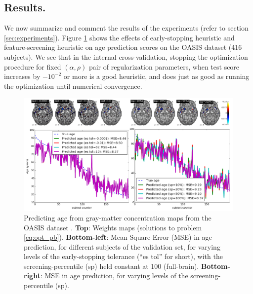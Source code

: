 \subsection{Results.}
We now summarize and comment the results of the experiments (refer to
section \ref{sec:experiments}).
Figure \ref{fig:oasis} shows the effects of early-stopping heuristic
and feature-screening heuristic on age prediction scores on the OASIS
dataset  \citep{marcus2007open} (416 subjects). We see that in the
internal cross-validation, stopping  the optimization procedure for
fixed $(\alpha, \rho)$ pair of regularization parameters, when test
score increases by $-10^{-2}$ or more is a good heuristic, and does just
as good as running the optimization until numerical convergence. 
 \begin{figure}[!htb]
   \includegraphics[width=1\linewidth]{figures/screening_weights.png}
  \caption{Predicting age from gray-matter concentration maps from the
    OASIS dataset  \citep{marcus2007open}. \textbf{Top}:
    Weights maps (solutions to problem \eqref{eq:opt_pb}).
\textbf{Bottom-left}: Mean Square Error (MSE) in age prediction, for
different subjects of the validation set, for  varying levels of the
early-stopping tolerance (``es tol'' for short), with the
screening-percentile (sp) held constant at 100
(full-brain). \textbf{Bottom-right}: MSE in age prediction, for
varying levels of the screening-percentile (sp).%
}   
\label{fig:oasis}
\end{figure}
